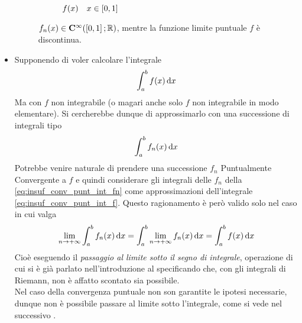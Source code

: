 \begin{itemize}
\begin{figure}[H]
			\begin{subfigure}{.49\textwidth}
				\centering
				\caption{$f(x) \quad x \in \left[0,1\right]$}
			\end{subfigure}
			\caption{$f_n(x) \in \mathbf{C^{\infty}}(\left[0,1\right]; \mathbb{R})$, mentre la funzione limite puntuale $f$ è discontinua.}
			\label{fig:cont_fn_non_passa_a_f}
		\end{figure}
	\item
		Supponendo di voler calcolare l'integrale
		\begin{equation}
			\label{eq:insuf_conv_punt_int_f}
			\int_a^b f(x) \,\mathrm{d}{x}
		\end{equation}
		Ma con $f$ non integrabile (o magari anche solo $f$ non integrabile in modo elementare). Si cercherebbe dunque di approssimarlo con una successione di integrali tipo
		\begin{equation}
			\label{eq:insuf_conv_punt_int_fn}
			\int_a^b f_n(x) \,\mathrm{d}{x}
		\end{equation}
		Potrebbe venire naturale di prendere una successione $f_n$ Puntualmente Convergente a $f$ e quindi considerare gli integrali delle $f_n$ della \cref{eq:insuf_conv_punt_int_fn} come approssimazioni dell'integrale \cref{eq:insuf_conv_punt_int_f}. Questo ragionamento è però valido solo nel caso in cui valga
		\begin{equation}
			\label{eq:conv_punt_pass_lim_integrale}
			\lim\limits_{n \to +\infty} \int_a^b f_n(x) \,\mathrm{d}{x} = \int_a^b \lim\limits_{n \to +\infty} f_n(x) \,\mathrm{d}{x} = \int_a^b f(x) \,\mathrm{d}{x}
		\end{equation}
		Cioè eseguendo il \textit{passaggio al limite sotto il segno di integrale}, operazione di cui si è già parlato nell'introduzione al  specificando che, con gli integrali di Riemann, non è affatto scontato sia possibile.\\
		Nel caso della convergenza puntuale non son garantite le ipotesi necessarie, dunque non è possibile passare al limite sotto l'integrale, come si vede nel successivo .
\end{itemize}
